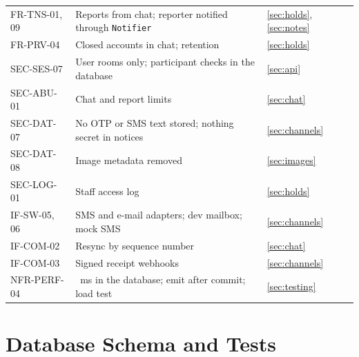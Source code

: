 \documentclass[11pt,a4paper]{article}
\begin{document}
{\begin{longtable}{@{}>{\ttfamily}p{2.4cm}>{\raggedright\arraybackslash}p{10.6cm}>{\raggedright\arraybackslash}p{2.2cm}@{}}
FR-TNS-01, 09 & Reports from chat; reporter notified through \texttt{Notifier} & \ref{sec:holds}, \ref{sec:notes} \\
FR-PRV-04 & Closed accounts in chat; retention & \ref{sec:holds} \\
SEC-SES-07 & User rooms only; participant checks in the database & \ref{sec:api} \\
SEC-ABU-01 & Chat and report limits & \ref{sec:chat} \\
SEC-DAT-07 & No OTP or SMS text stored; nothing secret in notices & \ref{sec:channels} \\
SEC-DAT-08 & Image metadata removed & \ref{sec:images} \\
SEC-LOG-01 & Staff access log & \ref{sec:holds} \\
IF-SW-05, 06 & SMS and e-mail adapters; dev mailbox; mock SMS & \ref{sec:channels} \\
IF-COM-02 & Resync by sequence number & \ref{sec:chat} \\
IF-COM-03 & Signed receipt webhooks & \ref{sec:channels} \\
NFR-PERF-04 & 0.33~ms in the database; emit after commit; load test & \ref{sec:testing} \\
\bottomrule
\end{longtable}}

\section{Database Schema and Tests}
\label{app:ddl}
\end{document}
